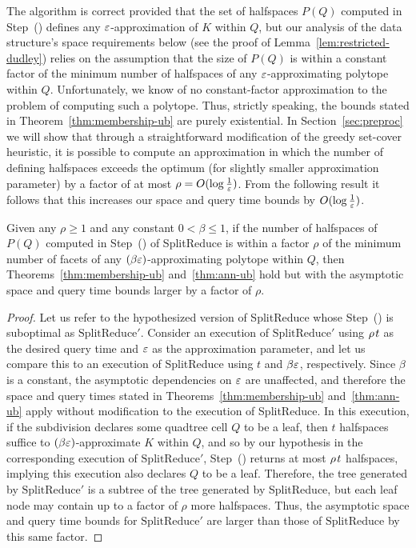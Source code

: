 \documentclass[11pt]{article}   \usepackage[letterpaper,hmargin=2.1cm,vmargin=3cm]{geometry}
\newcommand{\inv}[1]{\frac{1}{#1}}
\newcommand{\alg}{\textrm{SplitReduce}}
\begin{document}
The algorithm is correct provided that the set of halfspaces $P(Q)$ computed in Step~(\stepapx) defines any $\varepsilon$-approximation of $K$ within $Q$, but our analysis of the data structure's space requirements below (see the proof of Lemma~\ref{lem:restricted-dudley}) relies on the assumption that the size of $P(Q)$ is within a constant factor of the minimum number of halfspaces of any $\varepsilon$-approximating polytope within $Q$. Unfortunately, we know of no constant-factor approximation to the problem of computing such a polytope. Thus, strictly speaking, the bounds stated in Theorem~\ref{thm:membership-ub} are purely existential. In Section~\ref{sec:preproc} we will show that through a straightforward modification of the greedy set-cover heuristic, it is possible to compute an approximation in which the number of defining halfspaces exceeds the optimum (for slightly smaller approximation parameter) by a factor of at most $\rho = O(\log \inv{\eps})$. From the following result it follows that this increases our space and query time bounds by $O(\log \inv{\eps})$.

\begin{lemma} \label{lem:weak-membership}
Given any $\rho \ge 1$ and any constant $0 < \beta \le 1$, if the number of halfspaces of $P(Q)$ computed in Step~(\stepapx) of {\alg} is within a factor $\rho$ of the minimum number of facets of any $(\beta \varepsilon)$-approximating polytope within $Q$, then Theorems~\ref{thm:membership-ub} and~\ref{thm:ann-ub} hold but with the asymptotic space and query time bounds larger by a factor of $\rho$.
\end{lemma}


\begin{proof}
Let us refer to the hypothesized version of {\alg} whose Step~(\stepapx) is suboptimal as ${\alg}'$. Consider an execution of ${\alg}'$ using $\rho \kern1pt t$ as the desired query time and $\varepsilon$ as the approximation parameter, and let us compare this to an execution of {\alg} using $t$ and $\beta \varepsilon$, respectively. Since $\beta$ is a constant, the asymptotic dependencies on $\varepsilon$ are unaffected, and therefore the space and query times stated in Theorems~\ref{thm:membership-ub} and~\ref{thm:ann-ub} apply without modification to the execution of {\alg}. In this execution, if the subdivision declares some quadtree cell $Q$ to be a leaf, then $t$ halfspaces suffice to $(\beta \varepsilon)$-approximate $K$ within $Q$, and so by our hypothesis in the corresponding execution of ${\alg}'$, Step~(\stepapx) returns at most $\rho \kern1pt t$ halfspaces, implying this execution also declares $Q$ to be a leaf. Therefore, the tree generated by ${\alg}'$ is a subtree of the tree generated by {\alg}, but each leaf node may contain up to a factor of $\rho$ more halfspaces. Thus, the asymptotic space and query time bounds for ${\alg}'$ are larger than those of ${\alg} $ by this same factor.
\end{proof}
\end{document}
